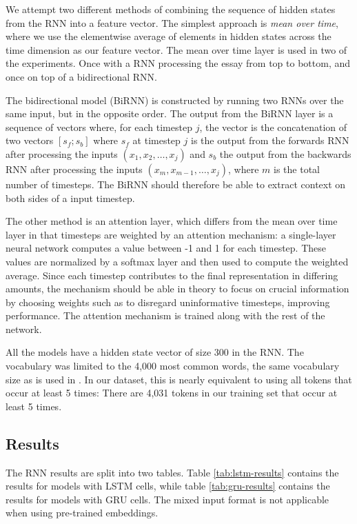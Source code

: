 We attempt two different methods of combining the sequence of hidden states
from the \ac{RNN} into a feature vector. The simplest approach is \emph{mean
over time}, where we use the elementwise average of elements in hidden states
across the time dimension as our feature vector. The mean over time layer is
used in two of the experiments. Once with a \ac{RNN} processing the essay
from top to bottom, and once on top of a bidirectional RNN.

The bidirectional model (BiRNN) is constructed by running two \acp{RNN} over
the same input, but in the opposite order. The output from the BiRNN layer is
a sequence of vectors where, for each timestep $j$, the vector is the
concatenation of two vectors $[s_f;s_b]$ where $s_f$ at timestep $j$ is the
output from the forwards \ac{RNN} after processing the inputs $(x_1, x_2,
\ldots, x_j)$ and $s_b$ the output from the backwards \ac{RNN} after
processing the inputs $(x_m, x_{m-1}, \ldots, x_j)$, where $m$ is the total
number of timesteps. The BiRNN should therefore be able to extract context on
both sides of a input timestep.


The other method is an attention layer, which differs from the mean over
time layer in that timesteps are weighted by an attention mechanism: a
single-layer neural network computes a value between -1 and 1 for each
timestep. These values are normalized by a softmax layer and then used to
compute the weighted average. Since each timestep contributes to the final
representation in differing amounts, the mechanism should be able in theory
to focus on crucial information by choosing weights such as to disregard
uninformative timesteps, improving performance. The attention mechanism is
trained along with the rest of the network.

All the models have a hidden state vector of size 300 in the \ac{RNN}. The
vocabulary was limited to the 4,000 most common words, the same vocabulary
size as is used in \textcite{taghipour16}. In our dataset, this is nearly
equivalent to using all tokens that occur at least 5 times: There are 4,031
tokens in our training set that occur at least 5 times.


\subsection{Results}

The RNN results are split into two tables. Table \ref{tab:lstm-results} contains
the results for models with \ac{LSTM} cells, while table \ref{tab:gru-results}
contains the results for models with \ac{GRU} cells. The mixed input format
is not applicable when using pre-trained embeddings.

